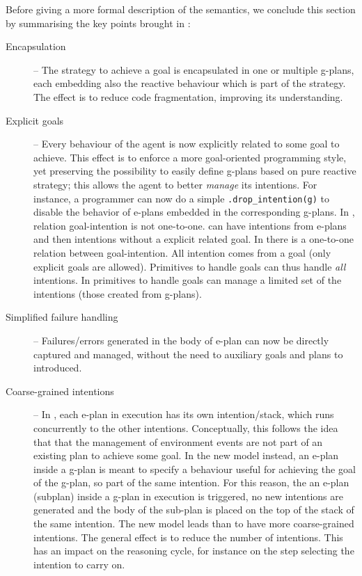 Before giving a more formal description of the semantics, we conclude this section by summarising the key points brought in {\aser}:
%
\begin{description}
%
\item[Encapsulation] -- The strategy to achieve a goal is encapsulated in one or multiple g-plans, each embedding also the reactive behaviour which is part of the strategy. 
%
The effect is to reduce code fragmentation, improving its understanding.
%
\item[Explicit goals] -- Every behaviour of the agent is now explicitly related to some goal to achieve.
%
This effect is to enforce a more goal-oriented programming style, yet preserving the possibility to easily define g-plans based on pure reactive strategy;
%
this allows the agent to better \emph{manage} its intentions. For instance, a programmer can now do a simple \texttt{.drop\_intention(g)} to disable the behavior of e-plans embedded in the corresponding g-plans. 
%
In {\asl}, relation goal-intention is not one-to-one. {\asl} can have intentions from e-plans and then intentions without a explicit related goal. %
In {\aser} there is a one-to-one relation between goal-intention. 
%
All intention comes from a goal (only explicit goals are allowed). 
%
Primitives to handle goals can thus handle \emph{all} intentions. 
%
In {\asl} primitives to handle goals can manage a limited set of the intentions (those created from g-plans). 


\item[Simplified failure handling] -- Failures/errors generated in the  body of e-plan can now be directly captured and managed, without the need to auxiliary goals and plans to introduced.

\item[Coarse-grained intentions] -- In {\asl}, each e-plan in execution has its own intention/stack, which runs concurrently to the other intentions. Conceptually, this follows the idea that that the management of environment events are not part of an existing plan to achieve some goal.
%
In the new model instead, an e-plan inside a g-plan is meant to specify a behaviour useful for achieving the goal of the g-plan, so part of the same intention.
%
For this reason, the an e-plan (subplan) inside a g-plan in execution is triggered, no new intentions are generated and the body of the sub-plan is placed on the top of the stack of the same intention. 
%
The new model leads than to have more coarse-grained intentions.
%
The general effect is to reduce the number of intentions. 
%
This has an impact on the reasoning cycle, for instance on the step selecting the intention to carry on.
\end{description}
